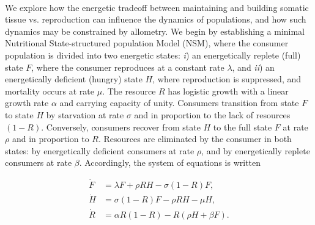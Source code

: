 \documentclass{pnastwo}
\begin{document}
\begin{article}
 \\ \nonumber
We explore how the energetic tradeoff between maintaining and building somatic tissue vs. reproduction can influence the dynamics of populations, and how such dynamics may be constrained by allometry.
We begin by establishing a minimal Nutritional State-structured population Model (NSM), where the consumer population is divided into two energetic states: \emph{i}) an energetically replete (full) state $F$, where the consumer reproduces at a constant rate $\lambda$, and \emph{ii}) an energetically deficient (hungry) state $H$, where reproduction is suppressed, and mortality occurs at rate $\mu$.
The resource $R$ has logistic growth with a linear growth rate $\alpha$ and carrying capacity of unity. %
Consumers transition from state $F$ to state $H$ by starvation at rate $\sigma$ and in proportion to the lack of resources $(1-R)$.
Conversely, consumers recover from state $H$ to the full state $F$ at rate $\rho$ and in proportion to $R$.
Resources are eliminated by the consumer in both states: by energetically deficient consumers at rate $\rho$, and by energetically replete consumers at rate $\beta$.
Accordingly, the system of equations is written


\begin{equation} \label{eq_specific}
\begin{aligned}
\dot{F} &= \lambda F + \rho RH - \sigma (1-R)F,  \\
\dot{H} &= \sigma (1-R)F - \rho RH - \mu H,  \\
\dot{R} &= \alpha R(1-R) - R(\rho H+ \beta F).
\end{aligned}
\end{equation}



\end{article}
\end{document}
